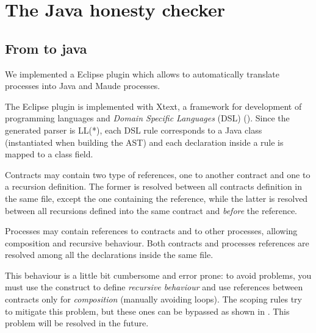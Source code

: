 
\section{The Java honesty checker}\label{sec:java-honesty}



\subsection{From \coco to java }
We implemented a \coco Eclipse plugin which allows to automatically
translate \coco processes into Java  and Maude processes.

The \coco Eclipse plugin is implemented with Xtext, a framework for
development of programming languages and \textit{Domain Specific
  Languages} (DSL) ().
%
Since the generated parser is LL(*), each DSL rule corresponds to a
Java class (instantiated when building the AST) and each declaration
inside a rule is mapped to a class field. 

Contracts may contain two type of references, one to another contract
and one to a recursion definition. The former is resolved between all
contracts definition in the same file, except the one containing the
reference, while the latter is resolved between all recursions defined
into the same contract and \emph{before} the reference.

Processes may contain references to contracts and to other processes,
allowing composition and recursive behaviour. Both contracts and
processes references are resolved among all the declarations inside
the same file.

%
  This behaviour is a little bit
cumbersome and error prone: to avoid problems, you must use the
 construct to define \textit{recursive behaviour} and
use references between contracts only for \textit{composition}
(manually avoiding loops). The scoping rules try to mitigate this
problem, but these ones can be bypassed as shown in
. This problem will be resolved in the
future.




